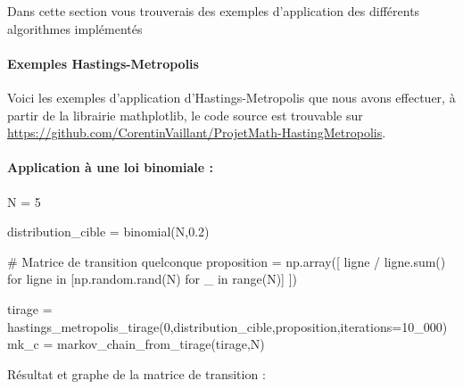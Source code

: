 \documentclass{article}
\begin{document}
Dans cette section vous trouverais des exemples d'application des différents algorithmes implémentés 

\paragraph{Exemples Hastings-Metropolis}

Voici les exemples d'application d'Hastings-Metropolis que nous avons effectuer,
à partir de la librairie mathplotlib, le code source est trouvable sur \url{https://github.com/CorentinVaillant/ProjetMath-HastingMetropolis}.

\paragraph{Application à une loi binomiale :}
\begin{center}
\begin{python}
N = 5

distribution_cible = binomial(N,0.2)

# Matrice de transition quelconque
proposition = np.array([ ligne / ligne.sum()
    for ligne in [np.random.rand(N) for _ in range(N)]
])


tirage = hastings_metropolis_tirage(0,distribution_cible,proposition,iterations=10_000)
mk_c = markov_chain_from_tirage(tirage,N)
\end{python}
\end{center}
Résultat et graphe de la matrice de transition :
\end{document}
